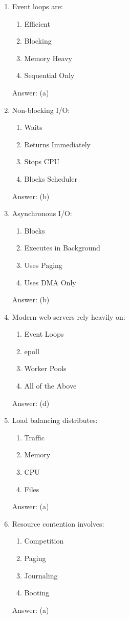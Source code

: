 \begin{enumerate}
\item Event loops are:
\begin{enumerate}[label=(\alph*)]
\item Efficient
\item Blocking
\item Memory Heavy
\item Sequential Only
\end{enumerate}
Answer: (a)

\item Non-blocking I/O:
\begin{enumerate}[label=(\alph*)]
\item Waits
\item Returns Immediately
\item Stops CPU
\item Blocks Scheduler
\end{enumerate}
Answer: (b)

\item Asynchronous I/O:
\begin{enumerate}[label=(\alph*)]
\item Blocks
\item Executes in Background
\item Uses Paging
\item Uses DMA Only
\end{enumerate}
Answer: (b)

\item Modern web servers rely heavily on:
\begin{enumerate}[label=(\alph*)]
\item Event Loops
\item epoll
\item Worker Pools
\item All of the Above
\end{enumerate}
Answer: (d)

\item Load balancing distributes:
\begin{enumerate}[label=(\alph*)]
\item Traffic
\item Memory
\item CPU
\item Files
\end{enumerate}
Answer: (a)

\item Resource contention involves:
\begin{enumerate}[label=(\alph*)]
\item Competition
\item Paging
\item Journaling
\item Booting
\end{enumerate}
Answer: (a)


\end{enumerate}
